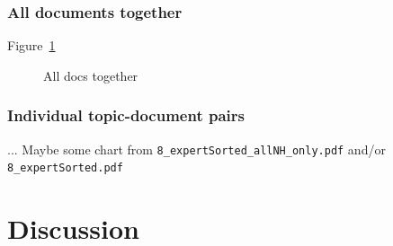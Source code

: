 \subsubsection{All documents together}
\label{sec:all-docum-togeth}


Figure~\ref{fig:check-ranks}

\begin{figure}[tbp]
  \centering
  \caption{All docs together  }
  \label{fig:check-ranks}
\end{figure}


\subsubsection{Individual topic-document pairs}
\label{sec:indiv-topic-docum}

... Maybe some chart from \verb|8_expertSorted_allNH_only.pdf| and/or \verb|8_expertSorted.pdf|


\section{Discussion} 
\label{sec:discussion}


